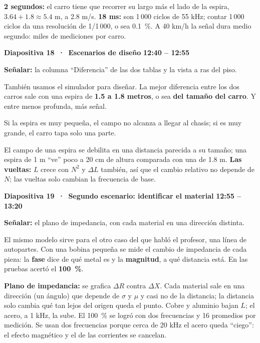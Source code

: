 \documentclass[11pt,a4paper]{article}
\newcommand{\diapo}[3]{%
  \par\vspace{8pt}
  {\large\bfseries Diapositiva #1 \,·\, #2}\hfill{\normalsize\bfseries\color{AzulIcesi} #3}\par
  \vspace{1pt}}
\newcommand{\senala}[1]{{\small\color{AzulIcesi}\textbf{Señalar:} #1}\par}
\begin{document}
\begin{nota}
\textbf{2 segundos:} el carro tiene que recorrer su largo más el lado de la espira, $3.64 + 1.8 \approx 5.4$ m, a
2.8 m/s. \textbf{18 ms:} son 1\,000 ciclos de 55 kHz; contar 1\,000 ciclos da una resolución de 1/1\,000, o sea
0.1~\%. A 40 km/h la señal dura medio segundo: miles de mediciones por carro.
\end{nota}

\diapo{18}{Escenarios de diseño}{12:40 -- 12:55}
\senala{la columna ``Diferencia'' de las dos tablas y la vista a ras del piso.}

También usamos el simulador para diseñar. La mejor diferencia entre los dos carros sale con una espira de
\textbf{1.5 a 1.8 metros}, o sea \textbf{del tamaño del carro}. Y entre menos profunda, más señal.

\begin{opcional}
Si la espira es muy pequeña, el campo no alcanza a llegar al chasis; si es muy grande, el carro tapa solo una
parte.
\end{opcional}

\begin{nota}
El campo de una espira se debilita en una distancia parecida a su tamaño; una espira de 1 m ``ve'' poco a 20 cm de
altura comparada con una de 1.8 m. \textbf{Las vueltas:} $L$ crece con $N^2$ y $\Delta L$ también, así que el
cambio relativo no depende de $N$; las vueltas solo cambian la frecuencia de base.
\end{nota}

\diapo{19}{Segundo escenario: identificar el material}{12:55 -- 13:20}
\senala{el plano de impedancia, con cada material en una dirección distinta.}

El mismo modelo sirve para el otro caso del que habló el profesor, una línea de autopartes. Con una bobina pequeña
se mide el cambio de impedancia de cada pieza: la \textbf{fase} dice de qué metal es y la \textbf{magnitud}, a qué
distancia está. En las pruebas acertó el \textbf{100~\%}.

\begin{nota}
\textbf{Plano de impedancia:} se grafica $\Delta R$ contra $\Delta X$. Cada material sale en una dirección (un
ángulo) que depende de $\sigma$ y $\mu$ y casi no de la distancia; la distancia solo cambia qué tan lejos del origen
queda el punto. Cobre y aluminio bajan $L$; el acero, a 1 kHz, la sube. El 100~\% se logró con dos frecuencias y
16 promedios por medición. Se usan dos frecuencias porque cerca de 20 kHz el acero queda ``ciego'': el efecto
magnético y el de las corrientes se cancelan.
\end{nota}
\end{document}
